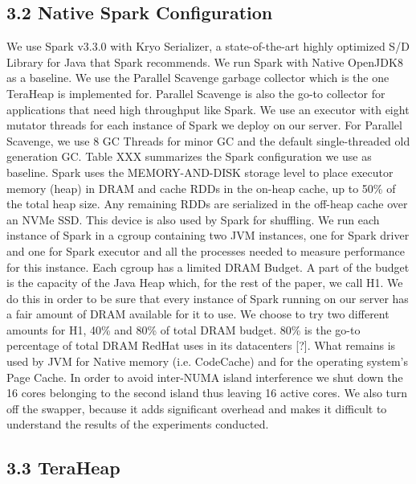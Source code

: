 \documentclass[twocolumn,10pt]{asme2e}
\begin{document}
\subsection*{3.2 Native Spark Configuration}
We use Spark v3.3.0 with Kryo Serializer, a state-of-the-art highly optimized S/D Library for Java that Spark recommends. We run Spark with Native OpenJDK8 as a baseline. We use the Parallel Scavenge garbage collector which is the one TeraHeap is implemented for. Parallel Scavenge is also the go-to collector for applications that need high throughput like Spark. We use an executor with eight mutator threads for each instance of Spark we deploy on our server. For Parallel Scavenge, we use 8 GC Threads for minor GC and the default single-threaded old generation GC. Table XXX summarizes the Spark configuration we use as baseline. Spark uses the MEMORY-AND-DISK storage level to place executor memory (heap) in DRAM and cache RDDs in the on-heap cache, up to 50\% of the total heap size. Any remaining RDDs are serialized in the off-heap cache over an NVMe SSD. This device is also used by Spark for shuffling. We run each instance of Spark in a cgroup containing two JVM instances, one for Spark driver and one for Spark executor and all the processes needed to measure performance for this instance. Each cgroup has a limited DRAM Budget. A part of the budget is the capacity of the Java Heap which, for the rest of the paper, we call H1. We do this in order to be sure that every instance of Spark running on our server has a fair amount of DRAM available for it to use. We choose to try two different amounts for H1, 40\% and 80\% of total DRAM budget. 80\% is the go-to percentage of total DRAM RedHat uses in its datacenters [?]. What remains is used by JVM for Native memory (i.e. CodeCache) and for the operating system's Page Cache. In order to avoid inter-NUMA island interference we shut down the 16 cores belonging to the second island thus leaving 16 active cores. We also turn off the swapper, because it adds significant overhead and makes it difficult to understand the results of the experiments conducted.

\subsection*{3.3 TeraHeap}
\end{document}
